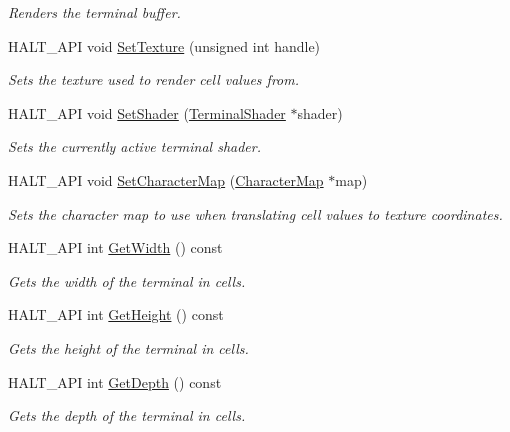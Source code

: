 \begin{DoxyCompactItemize}
\begin{DoxyCompactList}\small\item\em \-Renders the terminal buffer. \end{DoxyCompactList}\item 
\-H\-A\-L\-T\-\_\-\-A\-P\-I void \hyperlink{classhalt_1_1_terminal_ad1db219d67c569215b636719c5dd4c15}{\-Set\-Texture} (unsigned int handle)
\begin{DoxyCompactList}\small\item\em \-Sets the texture used to render cell values from. \end{DoxyCompactList}\item 
\-H\-A\-L\-T\-\_\-\-A\-P\-I void \hyperlink{classhalt_1_1_terminal_a3c6a77cdda36463d21833c358e64cd5a}{\-Set\-Shader} (\hyperlink{classhalt_1_1_terminal_shader}{\-Terminal\-Shader} $\ast$shader)
\begin{DoxyCompactList}\small\item\em \-Sets the currently active terminal shader. \end{DoxyCompactList}\item 
\-H\-A\-L\-T\-\_\-\-A\-P\-I void \hyperlink{classhalt_1_1_terminal_a5f66018dc90c6429778862d675520715}{\-Set\-Character\-Map} (\hyperlink{classhalt_1_1_character_map}{\-Character\-Map} $\ast$map)
\begin{DoxyCompactList}\small\item\em \-Sets the character map to use when translating cell values to texture coordinates. \end{DoxyCompactList}\item 
\-H\-A\-L\-T\-\_\-\-A\-P\-I int \hyperlink{classhalt_1_1_terminal_aeda94c3a3b880a93d6c37ff64513f661}{\-Get\-Width} () const 
\begin{DoxyCompactList}\small\item\em \-Gets the width of the terminal in cells. \end{DoxyCompactList}\item 
\-H\-A\-L\-T\-\_\-\-A\-P\-I int \hyperlink{classhalt_1_1_terminal_ac55c520afb3f46543c0181d63a5eb10d}{\-Get\-Height} () const 
\begin{DoxyCompactList}\small\item\em \-Gets the height of the terminal in cells. \end{DoxyCompactList}\item 
\-H\-A\-L\-T\-\_\-\-A\-P\-I int \hyperlink{classhalt_1_1_terminal_af35c5dc4130bc743729421590806379c}{\-Get\-Depth} () const 
\begin{DoxyCompactList}\small\item\em \-Gets the depth of the terminal in cells. \end{DoxyCompactList}\end{DoxyCompactItemize}


